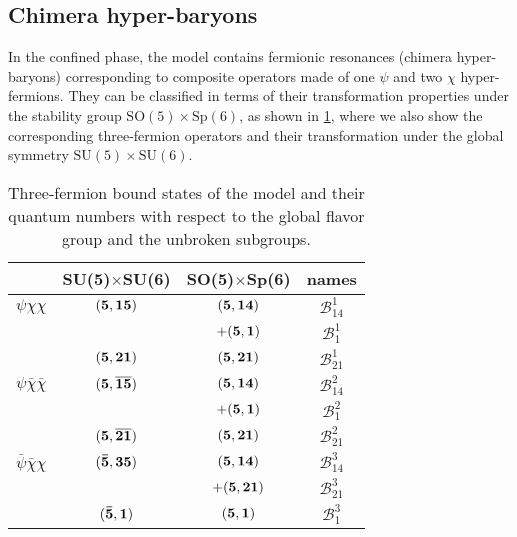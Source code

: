 \documentclass[preprintnumbers,nofootinbib,showpacs,eqsecnum,pre,12pt]{revtex4-1}
\newcommand{\SO}{\text{SO}}
\newcommand{\SU}{\text{SU}}
\newcommand{\Sp}{\text{Sp}}
\begin{document}
 
 
\subsection{Chimera hyper-baryons}
\label{sec:hyperbaryons}

In the confined phase, the model contains fermionic resonances (chimera hyper-baryons) corresponding to composite operators made of one $\psi$ and two $\chi$ hyper-fermions. They can be classified in terms of their transformation properties under the stability group $\SO(5) \times \Sp(6)$, as shown in \cref{tab:bdstates}, where we also show the corresponding three-fermion operators and their transformation under the global symmetry $\SU(5) \times \SU(6)$. 

\begin{table}[htb]
	\begin{center}
		\begin{tabular}{|c|c|c|c|}
			\hline
			 & SU(5)$\times$SU(6) & SO(5)$\times$Sp(6) & names \\
			\hline \hline
			$\psi \chi \chi$  & $(\bf{5}, \bf{15})$ & $(\bf{5}, \bf{14})$ & $\mathcal{B}^1_{14}$ \\
			                         &                             & $+ (\bf{5}, \bf{1})$ & $\mathcal{B}^1_{1}$\\			
			                         & $(\bf{5}, \bf{21})$ & $(\bf{5}, \bf{21})$ & $\mathcal{B}^1_{21}$\\
			\hline
			$\psi \bar{\chi} \bar{\chi}$  & $(\bf{5}, \bf{\overline{15}})$ & $(\bf{5}, \bf{14})$ &$\mathcal{B}^2_{14}$  \\
                                     &                                & $+ (\bf{5}, \bf{1})$ & $\mathcal{B}^2_{1}$ \\
                                    & $(\bf{5}, \bf{\overline{21}})$ & $(\bf{5}, \bf{21})$ & $\mathcal{B}^2_{21}$\\
			\hline
			$\bar{\psi} \bar{\chi} \chi$  & $(\bf{\bar 5}, \bf{35})$ & $(\bf{5}, \bf{14})$ & $\mathcal{B}^3_{14}$  \\
			                                    &                           & $+ (\bf{5}, \bf{21})$ & $\mathcal{B}^3_{21}$\\
			                                 &  $(\bf{\bar 5}, \bf{1})$  & $(\bf{5}, \bf{1})$ & $\mathcal{B}^3_{1}$\\
			
			\hline
			\hline
		\end{tabular} 
		\caption{Three-fermion bound states of the model and their quantum numbers with respect to the global flavor group and the unbroken subgroups.}
		\label{tab:bdstates}
	\end{center}
\end{table}
\end{document}

